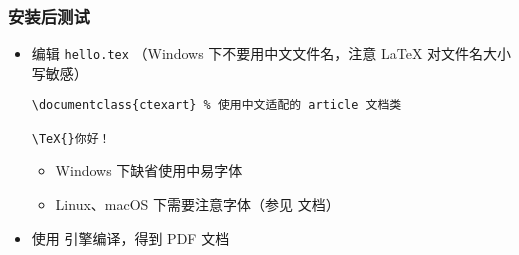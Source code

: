 



\begin{frame}[fragile]
  \frametitle{安装后测试}

  \begin{itemize}
    \item 编辑 \texttt{hello.tex} （Windows 下不要用中文文件名，注意
      \LaTeX{} 对文件名大小写敏感）
      \lstset{language=[LaTeX]TeX}
      \begin{card} \begin{lstlisting}[basicstyle=\ttfamily]
\documentclass{ctexart} % 使用中文适配的 article 文档类

\TeX{}你好！

        \end{lstlisting}\end{card}
      \begin{itemize}
        \item Windows 下缺省使用中易字体
        \item Linux、macOS 下需要注意字体（参见  文档）
      \end{itemize}
    \item 使用 \XeLaTeX{} 引擎编译，得到 PDF 文档
      \begin{center}
      \end{center}
  \end{itemize}
\end{frame}

